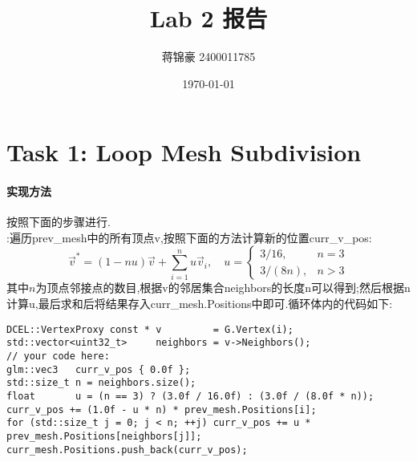 \documentclass{ctexart}
\title{\textbf{Lab 2 报告}}
\author{蒋锦豪 2400011785}
\date{\today}
\begin{document}
\maketitle
\section*{Task 1: Loop Mesh Subdivision}
\paragraph{实现方法}
按照下面的步骤进行.\\
\indent {}:遍历{\codefont prev\_mesh}中的所有顶点{\codefont v},按照下面的方法计算新的位置{\codefont curr\_v\_pos}:
\[\vec{v}^\ast=(1-nu)\vec{v}+\sum_{i=1}^{n}u\vec{v}_i,\quad u=\begin{cases}
    3/16,&n=3\\
    3/(8n),&n>3
\end{cases}\]
其中$n$为顶点邻接点的数目,根据{\codefont v}的邻居集合{\codefont neighbors}的长度{\codefont n}可以得到;然后根据{\codefont n}计算{\codefont u},最后求和后将结果存入{\codefont curr\_mesh.Positions}中即可.循环体内的代码如下:
\begin{lstlisting}
DCEL::VertexProxy const * v         = G.Vertex(i);
std::vector<uint32_t>     neighbors = v->Neighbors();
// your code here:
glm::vec3   curr_v_pos { 0.0f };
std::size_t n = neighbors.size();
float       u = (n == 3) ? (3.0f / 16.0f) : (3.0f / (8.0f * n));
curr_v_pos += (1.0f - u * n) * prev_mesh.Positions[i];
for (std::size_t j = 0; j < n; ++j) curr_v_pos += u * prev_mesh.Positions[neighbors[j]];
curr_mesh.Positions.push_back(curr_v_pos);
\end{lstlisting}
\end{document}
